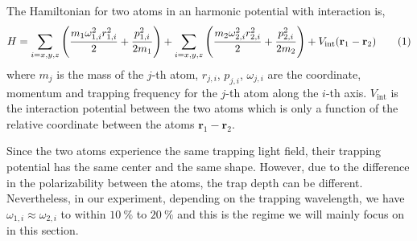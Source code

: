 The Hamiltonian for two atoms in an harmonic potential with interaction is,
\[
  H=\sum_{i=x,y,z}\paren{\frac{m_{1}\omega_{1,i}^2r_{1,i}^2}{2}+\frac{p_{1,i}^2}{2m_{1}}}+\sum_{i=x,y,z}\paren{\frac{m_{2}\omega_{2,i}^2r_{2,i}^2}{2}+\frac{p_{2,i}^2}{2m_{2}}}+V_{\mathrm{int}}\paren{\mathbf{r}_1-\mathbf{r}_2}\numberthis{eq:interaction-shift:orig-hamiltonian}
\]
where $m_j$ is the mass of the $j$-th atom,
$r_{j,i}$, $p_{j,i}$, $\omega_{j,i}$ are the coordinate, momentum and trapping frequency
for the $j$-th atom along the $i$-th axis.
$V_{\mathrm{int}}$ is the interaction potential between the two atoms which is only a function
of the relative coordinate between the atoms $\mathbf{r}_1-\mathbf{r}_2$.

Since the two atoms experience the same trapping light field,
their trapping potential has the same center and the same shape.
However, due to the difference in the polarizability between the atoms,
the trap depth can be different.
Nevertheless, in our experiment, depending on the trapping wavelength,
we have $\omega_{1,i}\approx\omega_{2,i}$ to within $10~\mathrm{\%}$ to $20~\mathrm{\%}$
and this is the regime we will mainly focus on in this section.

